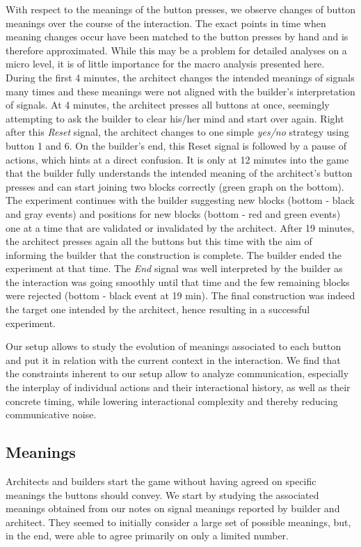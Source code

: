 With respect to the meanings of the button presses, we observe changes of button meanings over the course of the interaction. The exact points in time when meaning changes occur have been matched to the button presses by hand and is therefore approximated. While this may be a problem for detailed analyses on a micro level, it is of little importance for the macro analysis presented here. During the first 4 minutes, the architect changes the intended meanings of signals many times and these meanings were not aligned with the builder's interpretation of signals. At 4 minutes, the architect presses all buttons at once, seemingly attempting to ask the builder to clear his/her mind and start over again. Right after this \emph{Reset} signal, the architect changes to one simple \emph{yes/no} strategy using button 1 and 6. On the builder's end, this Reset signal is followed by a pause of actions, which hints at a direct confusion. It is only at 12 minutes into the game that the builder fully understands the intended meaning of the architect's button presses and can start joining two blocks correctly (green graph on the bottom). The experiment continues with the builder suggesting new blocks (bottom - black and gray events) and positions for new blocks (bottom - red and green events) one at a time that are validated or invalidated by the architect. After 19 minutes, the architect presses again all the buttons but this time with the aim of informing the builder that the construction is complete. The builder ended the experiment at that time. The \emph{End} signal was well interpreted by the builder as the interaction was going smoothly until that time and the few remaining blocks were rejected (bottom - black event at 19 min). The final construction was indeed the target one intended by the architect, hence resulting in a successful experiment.

Our setup allows to study the evolution of meanings associated to each button and put it in relation with the current context in the interaction. We find that the constraints inherent to our setup allow to analyze communication, especially the interplay of individual actions and their interactional history, as well as their concrete timing, while lowering interactional complexity and thereby reducing communicative noise.

\subsection{Meanings}

Architects and builders start the game without having agreed on specific meanings the buttons should convey. We start by studying the associated meanings obtained from our notes on signal meanings reported by builder and architect. They seemed to initially consider a large set of possible meanings, but, in the end, were able to agree primarily on only a limited number.

